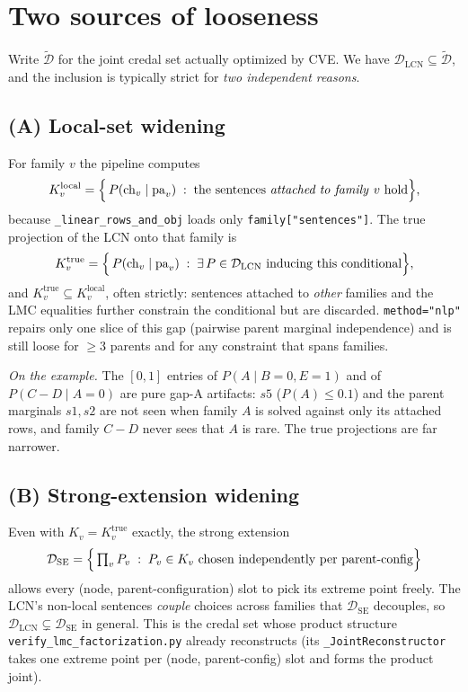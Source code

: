 \documentclass[11pt]{article}
\begin{document}
\section{Two sources of looseness}\label{sec:sources}

Write $\widetilde{\mathcal{D}}$ for the joint credal set actually optimized by CVE. We
have $\mathcal{D}_{\mathrm{LCN}} \subseteq \widetilde{\mathcal{D}}$, and the inclusion is
typically strict for \emph{two independent reasons}.

\subsection{(A) Local-set widening}

For family $v$ the pipeline computes
\[
  K_v^{\mathrm{local}}
  = \Bigl\{\, P(\mathrm{ch}_v\mid\mathrm{pa}_v) \;:\; \text{the sentences \emph{attached to family }} v \text{ hold} \Bigr\},
\]
because \texttt{\_linear\_rows\_and\_obj} loads only \texttt{family["sentences"]}. The true
projection of the LCN onto that family is
\[
  K_v^{\mathrm{true}}
  = \Bigl\{\, P(\mathrm{ch}_v\mid\mathrm{pa}_v) \;:\; \exists\, P\in\mathcal{D}_{\mathrm{LCN}} \text{ inducing this conditional} \Bigr\},
\]
and $K_v^{\mathrm{true}} \subseteq K_v^{\mathrm{local}}$, often strictly: sentences attached
to \emph{other} families and the LMC equalities further constrain the conditional but are
discarded. \texttt{method="nlp"} repairs only one slice of this gap (pairwise parent
marginal independence) and is still loose for $\ge 3$ parents and for any constraint that
spans families.

\smallskip\noindent\emph{On the example.} The $[0,1]$ entries of $P(A\mid B{=}0,E{=}1)$ and
of $P(C\!-\!D\mid A{=}0)$ are pure gap-A artifacts: $s5$ ($P(A)\le0.1$) and the parent
marginals $s1,s2$ are not seen when family $A$ is solved against only its attached rows,
and family $C\!-\!D$ never sees that $A$ is rare. The true projections are far narrower.

\subsection{(B) Strong-extension widening}

Even with $K_v = K_v^{\mathrm{true}}$ exactly, the strong extension
\[
  \mathcal{D}_{\mathrm{SE}}
  = \Bigl\{\, \textstyle\prod_v P_v \;:\; P_v \in K_v \text{ chosen independently per parent-config} \Bigr\}
\]
allows every (node, parent-configuration) slot to pick its extreme point freely. The
LCN's non-local sentences \emph{couple} choices across families that $\mathcal{D}_{\mathrm{SE}}$
decouples, so $\mathcal{D}_{\mathrm{LCN}} \subsetneq \mathcal{D}_{\mathrm{SE}}$ in general.
This is the credal set whose product structure \texttt{verify\_lmc\_factorization.py}
already reconstructs (its \texttt{\_JointReconstructor} takes one extreme point per
(node, parent-config) slot and forms the product joint).
\end{document}
